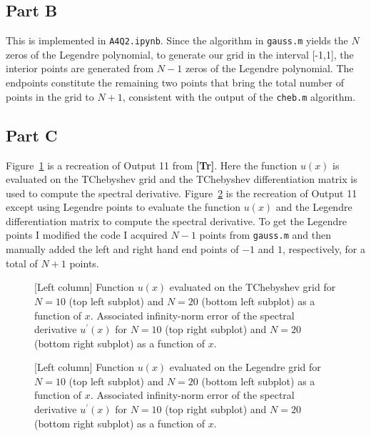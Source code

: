 \documentclass[12pt]{article}
\begin{document}
\subsection*{Part B}

This is implemented in \verb|A4Q2.ipynb|. Since the algorithm in \verb|gauss.m| yields the $N$ zeros of the Legendre polynomial, to generate our grid in the interval [-1,1], the interior points are generated from $N-1$ zeros of the Legendre polynomial. The endpoints 
constitute the remaining two points that bring the total number of points in the grid to $N+1$, consistent with the output of the \verb|cheb.m| algorithm. 

\subsection*{Part C}

Figure~\ref{fig:tchebyshev_err} is a recreation of Output 11 from \textbf{[Tr]}. Here the function $u(x)$ is evaluated on the TChebyshev grid and the TChebyshev differentiation matrix is used to compute the spectral derivative. Figure~\ref{fig:legendre_err} is the recreation of Output 11 except using Legendre points to evaluate the function $u(x)$ and the Legendre differentiation matrix to compute the spectral derivative. To get the Legendre points I modified the code I acquired $N-1$ points from \verb|gauss.m| and then manually added the left and right hand end points of $-1$ and $1$, respectively, for a total of $N+1$ points.

\begin{figure}[!h]
	\centering
	\caption{[Left column] Function $u(x)$ evaluated on the TChebyshev grid for $N=10$ (top left subplot) and $N=20$ (bottom left subplot) as a function of $x$. Associated infinity-norm error of the spectral derivative $u^{\prime}(x)$ for $N=10$ (top right subplot) and $N=20$ (bottom right subplot) as a function of $x$.}
	\label{fig:tchebyshev_err}
\end{figure}

\begin{figure}[!h]
	\centering	
	\caption{[Left column] Function $u(x)$ evaluated on the Legendre grid for $N=10$ (top left subplot) and $N=20$ (bottom left subplot) as a function of $x$. Associated infinity-norm error of the spectral derivative $u^{\prime}(x)$ for $N=10$ (top right subplot) and $N=20$ (bottom right subplot) as a function of $x$.}
	\label{fig:legendre_err}
\end{figure}
\end{document}
